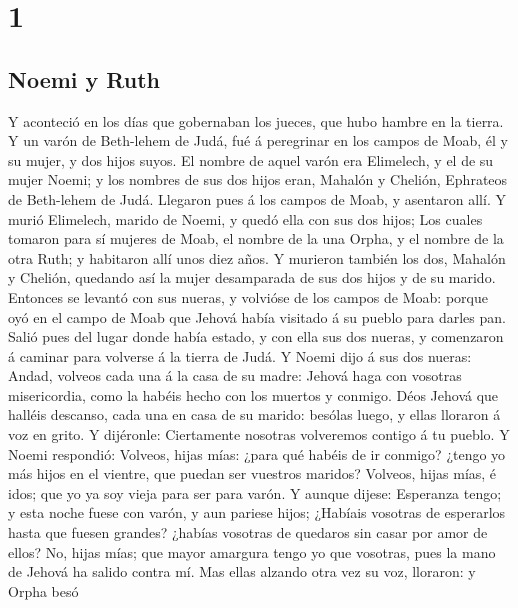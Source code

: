 \hypertarget{section}{%
\section{1}\label{section}}

\hypertarget{noemi-y-ruth}{%
\subsection{Noemi y Ruth}\label{noemi-y-ruth}}

 Y aconteció en los días que gobernaban los jueces, que hubo
hambre en la tierra. Y un varón de Beth-lehem de Judá, fué á peregrinar
en los campos de Moab, él y su mujer, y dos hijos suyos.  El
nombre de aquel varón era Elimelech, y el de su mujer Noemi; y los
nombres de sus dos hijos eran, Mahalón y Chelión, Ephrateos de
Beth-lehem de Judá. Llegaron pues á los campos de Moab, y asentaron
allí.  Y murió Elimelech, marido de Noemi, y quedó ella con
sus dos hijos;  Los cuales tomaron para sí mujeres de Moab,
el nombre de la una Orpha, y el nombre de la otra Ruth; y habitaron allí
unos diez años.  Y murieron también los dos, Mahalón y
Chelión, quedando así la mujer desamparada de sus dos hijos y de su
marido.  Entonces se levantó con sus nueras, y volvióse de
los campos de Moab: porque oyó en el campo de Moab que Jehová había
visitado á su pueblo para darles pan.  Salió pues del lugar
donde había estado, y con ella sus dos nueras, y comenzaron á caminar
para volverse á la tierra de Judá.  Y Noemi dijo á sus dos
nueras: Andad, volveos cada una á la casa de su madre: Jehová haga con
vosotras misericordia, como la habéis hecho con los muertos y conmigo.
 Déos Jehová que halléis descanso, cada una en casa de su
marido: besólas luego, y ellas lloraron á voz en grito.  Y
dijéronle: Ciertamente nosotras volveremos contigo á tu pueblo.
 Y Noemi respondió: Volveos, hijas mías: ¿para qué habéis
de ir conmigo? ¿tengo yo más hijos en el vientre, que puedan ser
vuestros maridos?  Volveos, hijas mías, é idos; que yo ya
soy vieja para ser para varón. Y aunque dijese: Esperanza tengo; y esta
noche fuese con varón, y aun pariese hijos;  ¿Habíais
vosotras de esperarlos hasta que fuesen grandes? ¿habías vosotras de
quedaros sin casar por amor de ellos? No, hijas mías; que mayor amargura
tengo yo que vosotras, pues la mano de Jehová ha salido contra mí.
 Mas ellas alzando otra vez su voz, lloraron: y Orpha besó
